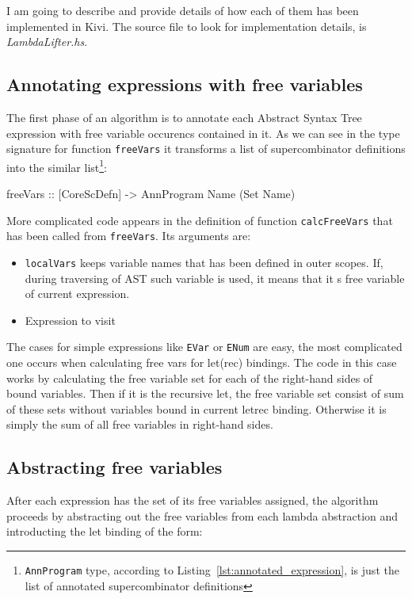 \documentclass[12pt,a4paper]{report}
\begin{document}
I am going to describe and provide details of how each of them has been
implemented in Kivi. The source file to look for implementation details, is
\textit{LambdaLifter.hs}.

\subsection{Annotating expressions with free variables}
The first phase of an algorithm is to annotate each Abstract Syntax Tree
expression with free variable occurencs contained in it. As we can see in the
type signature for function \texttt{freeVars} it transforms a list of
supercombinator definitions into the similar list\footnote{\texttt{AnnProgram}
type, according to Listing~\ref{lst:annotated_expression}, is just the list of
annotated supercombinator definitions}:

\vspace*{0.2in}
\begin{code}[style=haskell]
freeVars :: [CoreScDefn] -> AnnProgram Name (Set Name)
\end{code}

More complicated code appears in the definition of function
\texttt{calcFreeVars} that has been called from \texttt{freeVars}. Its
arguments are:
\begin{itemize}
  \item \texttt{localVars} keeps variable names that has been defined in outer
    scopes. If, during traversing of AST such variable is used, it means that
    it s free variable of current expression.
  \item Expression to visit
\end{itemize}

The cases for simple expressions like \texttt{EVar} or \texttt{ENum} are easy,
the most complicated one occurs when calculating free vars for
let(rec) bindings. The code in this case works by calculating the free
variable set for each of the right-hand sides of bound variables. Then if it is
the recursive let, the free variable set consist of sum of these sets without
variables bound in current letrec binding. Otherwise it is simply the
sum of all free variables in right-hand sides.

\subsection{Abstracting free variables}
After each expression has the set of its free variables assigned, the algorithm
proceeds by abstracting out the free variables from each lambda abstraction and
introducting the let binding of the form:
\end{document}
